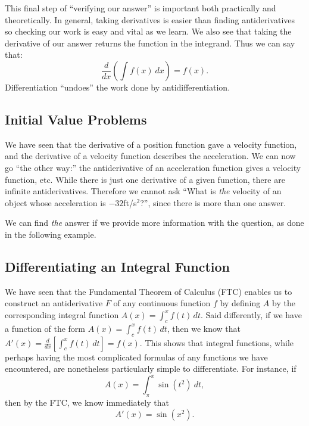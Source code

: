 This final step of ``verifying our answer'' is important both practically and theoretically. In general, taking derivatives is easier than finding antiderivatives so checking our work is easy and vital as we learn.  We also see that taking the derivative of our answer returns the function in the integrand. Thus we can say that: 
\[ \frac{d}{dx}\left(\int f(x)\ dx\right) = f(x). \]
Differentiation ``undoes'' the work done by antidifferentiation. 

\subsection*{Initial Value Problems}

We have seen that the derivative of a position function gave a velocity function, and the derivative of a velocity function describes the acceleration. We can now go ``the other way:'' the antiderivative of an acceleration function gives a velocity function, etc. While there is just one derivative of a given function, there are infinite antiderivatives. Therefore we cannot ask ``What is \textit{the} velocity of an object whose acceleration is $-32$ft/s$^2$?'', since there is more than one answer. 

We can find \textit{the} answer if we provide more information with the question, as done in the following example.





\subsection*{Differentiating an Integral Function}

We have seen that the Fundamental Theorem of Calculus (FTC) enables us to construct an antiderivative $F$ of any continuous function $f$ by defining $A$ by the corresponding integral function $A(x) = \int_c^x f(t) \, dt$.  Said differently, if we have a function of the form $A(x) = \int_c^x f(t) \, dt$, then we know that $A'(x) = \frac{d}{dx} \left[\int_c^x f(t) \, dt \right] = f(x)$.  This shows that integral functions, while perhaps having the most complicated formulas of any functions we have encountered, are nonetheless particularly simple to differentiate.  For instance, if 
\[ A(x) = \int_{\pi}^x \sin(t^2) \ dt, \]
then by the FTC, we know immediately that
\[ A'(x) = \sin(x^2). \]

